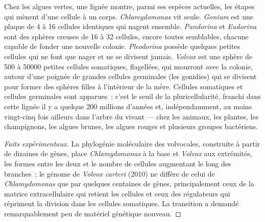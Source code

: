 \begin{proposition}\label{prop:b2:unicellular-diversity:volvox}
Chez les algues vertes, une lignée montre, parmi ses espèces actuelles,
les étapes qui mènent d'une cellule à un corps. \emph{Chlamydomonas} vit
seule. \emph{Gonium} est une plaque de 4 à 16 cellules identiques qui
nagent ensemble. \emph{Pandorina} et \emph{Eudorina} sont des sphères
creuses de 16 à 32 cellules, encore toutes semblables, chacune capable
de fonder une nouvelle colonie. \emph{Pleodorina} possède quelques
petites cellules qui ne font que nager et ne se divisent jamais.
\emph{Volvox} est une sphère de \num{500} à \num{50000} petites cellules
somatiques, flagellées, qui mourront avec la colonie, autour d'une
poignée de grandes cellules germinales (les gonidies) qui se divisent
pour former des sphères filles à l'intérieur de la mère. Cellules
somatiques et cellules germinales sont apparues~: c'est le seuil de la
pluricellularité, franchi dans cette lignée il y a quelque \num{200}
millions d'années et, indépendamment, au moins vingt-cinq fois ailleurs
dans l'arbre du vivant --- chez les animaux, les plantes, les
champignons, les algues brunes, les algues rouges et plusieurs groupes
bactériens.
\end{proposition}
\begin{proof}[Faits expérimentaux]
La phylogénie moléculaire des volvocales, construite à partir de
dizaines de gènes, place \emph{Chlamydomonas} à la base et \emph{Volvox}
aux extrémités, les formes  entre les deux et le nombre de
cellules augmentant le long des branches~; le génome de \emph{Volvox
carteri} (2010) ne diffère de celui de \emph{Chlamydomonas} que par
quelques centaines de gènes, principalement ceux de la matrice
extracellulaire qui retient les cellules et ceux des régulateurs qui
répriment la division dans les cellules somatiques. La transition a
demandé remarquablement peu de matériel génétique nouveau.
\end{proof}

